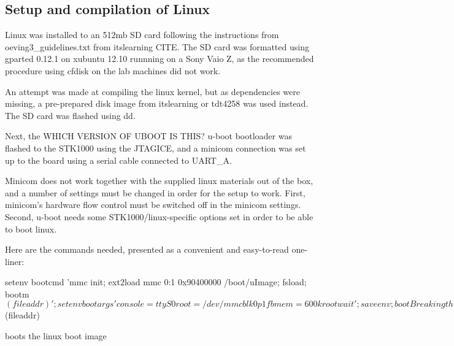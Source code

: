 
\subsection{Setup and compilation of Linux}

Linux was installed to an 512mb SD card following the instructions from oeving3_guidelines.txt from itslearning CITE. 
The SD card was formatted using gparted 0.12.1 on xubuntu 12.10 runnning on a Sony Vaio Z, as the recommended procedure using cfdisk on the lab machines did not work.

An attempt was made at compiling the linux kernel, but as dependencies were missing, a pre-prepared disk image from itslearning or tdt4258 was used instead. The SD card was flashed using dd.

Next, the WHICH VERSION OF UBOOT IS THIS? u-boot bootloader was flashed to the STK1000 using the JTAGICE, and a minicom connection was set up to the board using a serial cable connected to UART_A.

Minicom does not work together with the supplied linux materials out of the box, and a number of settings must be changed in order for the setup to work.
First, minicom's hardware flow control must be switched off in the minicom settings.
Second, u-boot needs some STK1000/linux-specific options set in order to be able to boot linux.

Here are the commands needed, presented as a convenient and easy-to-read one-liner:

setenv bootcmd 'mmc init; ext2load mmc 0:1 0x90400000 /boot/uImage; fsload; bootm $(fileaddr)'; setenv bootargs 'console=ttyS0 root=/dev/mmcblk0p1 fbmem=600k rootwait'; saveenv; boot

Breaking this command down into its subparts, it is easier to see what it does.

setenv bootcmd ...

This sets the command that are automatically run on boot.

mmc init

initializes the memory card controller on the development board

ext2load mmc 0:1 0x90400000 /boot/uImage

loads a ext2 filesystem from the sdcard and sets an entrypoint/location of linux' boot image

fsload

loads a filesystem probably

bootm $(fileaddr)

boots the linux boot image

